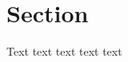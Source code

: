 \documentclass{article}
\begin{document}
\section{Section}
Text \cite{knuth_fa} text text text text

\printbibliography
\end{document}
